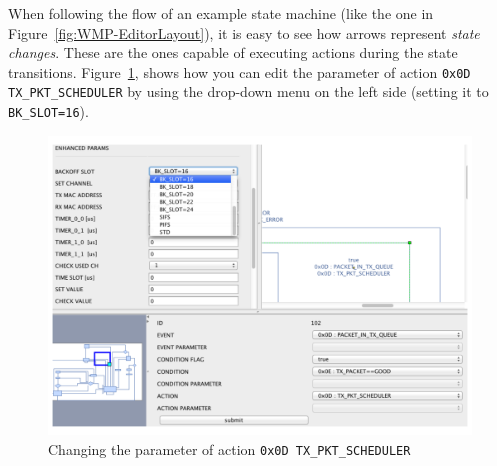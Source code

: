 When following the flow of an example state machine (like the one in Figure~\ref{fig:WMP-EditorLayout}), it is easy to see how arrows represent \emph{state changes}. These are the ones capable of executing actions during the state transitions. Figure~\ref{fig:WMP-EditorSetting}, shows how you can edit the parameter of action \texttt{0x0D TX\_PKT\_SCHEDULER} by using the drop-down menu on the left side (setting it to \texttt{BK\_SLOT=16}).

\begin{figure}[htbp]
  \centering
  \includegraphics[width=0.95\linewidth]{figures/WMP-EditorSetting.pdf}
  \caption{Changing the parameter of action \texttt{0x0D TX\_PKT\_SCHEDULER}
  \label{fig:WMP-EditorSetting}}
\end{figure}
